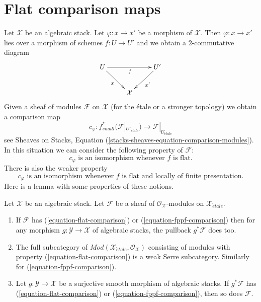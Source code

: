 \section{Flat comparison maps}
\label{section-flat-comparison}

\noindent
Let $\mathcal{X}$ be an algebraic stack. Let $\varphi : x \to x'$ be
a morphism of $\mathcal{X}$. Then $\varphi : x \to x'$ lies over a
morphism of schemes $f : U \to U'$ and we obtain a $2$-commutative diagram
$$
\xymatrix{
U \ar[rd]_x \ar[rr]_f & & U' \ar[ld]^{x'} \\
& \mathcal{X}
}
$$
Given a sheaf of modules $\mathcal{F}$ on $\mathcal{X}$
(for the \'etale or a stronger topology) we obtain a comparison map
\begin{equation}
\label{equation-comparison-modules}
c_\varphi :
f_{small}^*(\mathcal{F}|_{U'_{\acute{e}tale}})
\longrightarrow
\mathcal{F}|_{U_{\acute{e}tale}}
\end{equation}
see Sheaves on Stacks, Equation
(\ref{stacks-sheaves-equation-comparison-modules}).
In this situation we can consider the following property
of $\mathcal{F}$:
\begin{equation}
\label{equation-flat-comparison}
c_\varphi\text{ is an isomorphism whenever }f\text{ is flat.}
\end{equation}
There is also the weaker property
\begin{equation}
\label{equation-fppf-comparison}
c_\varphi\text{ is an isomorphism whenever }f
\text{ is flat and locally of finite presentation.}
\end{equation}
Here is a lemma with some properties of these notions.

\begin{lemma}
\label{lemma-check-flat-comparison-on-etale-covering}
Let $\mathcal{X}$ be an algebraic stack. Let $\mathcal{F}$
be a sheaf of $\mathcal{O}_\mathcal{X}$-modules on
$\mathcal{X}_{\acute{e}tale}$.
\begin{enumerate}
\item If $\mathcal{F}$ has (\ref{equation-flat-comparison}) or
(\ref{equation-fppf-comparison}) then for any morphism
$g : \mathcal{Y} \to \mathcal{X}$ of algebraic stacks, the
pullback $g^*\mathcal{F}$ does too.
\item The full subcategory of
$\textit{Mod}(\mathcal{X}_{\acute{e}tale}, \mathcal{O}_\mathcal{X})$
consisting of modules with property (\ref{equation-flat-comparison})
is a weak Serre subcategory. Similarly for (\ref{equation-fppf-comparison}).
\item  Let $g : \mathcal{Y} \to \mathcal{X}$ be a surjective smooth
morphism of algebraic stacks. If $g^*\mathcal{F}$
has (\ref{equation-flat-comparison}) or (\ref{equation-fppf-comparison}),
then so does $\mathcal{F}$.
\end{enumerate}
\end{lemma}

